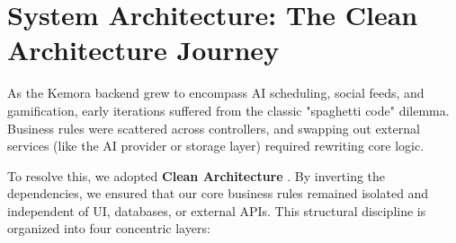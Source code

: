 \section{System Architecture: The Clean Architecture Journey}
As the Kemora backend grew to encompass AI scheduling, social feeds, and gamification, early iterations suffered from the classic "spaghetti code" dilemma. Business rules were scattered across controllers, and swapping out external services (like the AI provider or storage layer) required rewriting core logic. 

To resolve this, we adopted \textbf{Clean Architecture} \cite{cleanarchitecture}. By inverting the dependencies, we ensured that our core business rules remained isolated and independent of UI, databases, or external APIs. This structural discipline is organized into four concentric layers:

